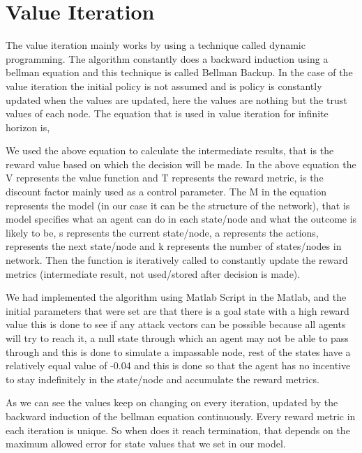 \section{Value Iteration}
The value iteration mainly works by using a technique called dynamic
programming. The algorithm constantly does a backward induction using a bellman
equation \autocite{Wikipedia2013} and this technique is called Bellman Backup. In the case of the
value iteration the initial policy is not assumed and is policy is constantly
updated when the values are updated, here the values are nothing but the trust
values of each node.  The equation that is used in value iteration for infinite
horizon is,  


We used the above equation to calculate the intermediate results, that is the
reward value based on which the decision will be made. In the above equation the
V represents the value function and T represents the reward metric,    is the
discount factor mainly used as a control parameter. The M in the equation
represents the model (in our case it can be the structure of the network), that
is model specifies what an agent can do in each state/node and what the outcome
is likely to be, s represents the current state/node, a represents the actions,
represents the next state/node and k represents the number of states/nodes in
network. Then the function is iteratively called to constantly update the reward
metrics (intermediate result, not used/stored after decision is made).

We had implemented the algorithm using Matlab Script in the Matlab, and the
initial parameters that were set are that there is a goal state with a high
reward value this is done to see if any attack vectors can be possible because
all agents will try to reach it, a null state through which an agent may not be
able to pass through and this is done to simulate a impassable node, rest of the
states have a relatively equal value of -0.04 and this is done so that the agent
has no incentive to stay indefinitely in the state/node and accumulate the
reward metrics.
 



 
 
As we can see the values keep on changing on every iteration, updated by the
backward induction of the bellman equation continuously. Every reward metric in
each iteration is unique. So when does it reach termination, that depends on the
maximum allowed error for state values that we set in our model. 

